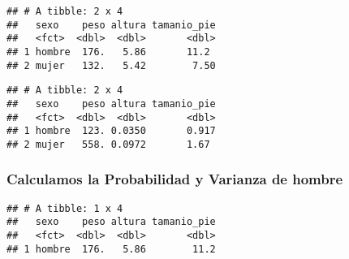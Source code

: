 \documentclass[]{article}
\newenvironment{Shaded}{\begin{snugshade}}{\end{snugshade}}
\newcommand{\KeywordTok}[1]{\textcolor[rgb]{0.13,0.29,0.53}{\textbf{#1}}}
\newcommand{\DataTypeTok}[1]{\textcolor[rgb]{0.13,0.29,0.53}{#1}}
\newcommand{\StringTok}[1]{\textcolor[rgb]{0.31,0.60,0.02}{#1}}
\newcommand{\CommentTok}[1]{\textcolor[rgb]{0.56,0.35,0.01}{\textit{#1}}}
\newcommand{\OperatorTok}[1]{\textcolor[rgb]{0.81,0.36,0.00}{\textbf{#1}}}
\newcommand{\NormalTok}[1]{#1}
\begin{document}
\begin{verbatim}
## # A tibble: 2 x 4
##   sexo    peso altura tamanio_pie
##   <fct>  <dbl>  <dbl>       <dbl>
## 1 hombre  176.   5.86       11.2 
## 2 mujer   132.   5.42        7.50
\end{verbatim}

\begin{Shaded}
\end{Shaded}

\begin{verbatim}
## # A tibble: 2 x 4
##   sexo    peso altura tamanio_pie
##   <fct>  <dbl>  <dbl>       <dbl>
## 1 hombre  123. 0.0350       0.917
## 2 mujer   558. 0.0972       1.67
\end{verbatim}

\subsubsection{Calculamos la Probabilidad y Varianza de
hombre}\label{calculamos-la-probabilidad-y-varianza-de-hombre}

\begin{Shaded}
\end{Shaded}

\begin{verbatim}
## # A tibble: 1 x 4
##   sexo    peso altura tamanio_pie
##   <fct>  <dbl>  <dbl>       <dbl>
## 1 hombre  176.   5.86        11.2
\end{verbatim}

\begin{Shaded}
\end{Shaded}
\end{document}
